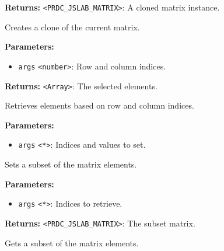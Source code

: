 \documentclass[12pt,a4paper]{article}
\begin{document}
\noindent \textbf{Returns:} \texttt{<PRDC\_JSLAB\_MATRIX>}: A cloned matrix instance.

\noindent Creates a clone of the current matrix.

\vspace{5mm}
\noindent {}


\noindent \textbf{Parameters:}
\begin{itemize}
  \item \texttt{args} \texttt{<number>}: Row and column indices.
\end{itemize}

\noindent \textbf{Returns:} \texttt{<Array>}: The selected elements.

\noindent Retrieves elements based on row and column indices.

\vspace{5mm}
\noindent {}


\noindent \textbf{Parameters:}
\begin{itemize}
  \item \texttt{args} \texttt{<*>}: Indices and values to set.
\end{itemize}

\noindent Sets a subset of the matrix elements.

\vspace{5mm}
\noindent {}


\noindent \textbf{Parameters:}
\begin{itemize}
  \item \texttt{args} \texttt{<*>}: Indices to retrieve.
\end{itemize}

\noindent \textbf{Returns:} \texttt{<PRDC\_JSLAB\_MATRIX>}: The subset matrix.

\noindent Gets a subset of the matrix elements.

\vspace{5mm}
\noindent {}
\end{document}
